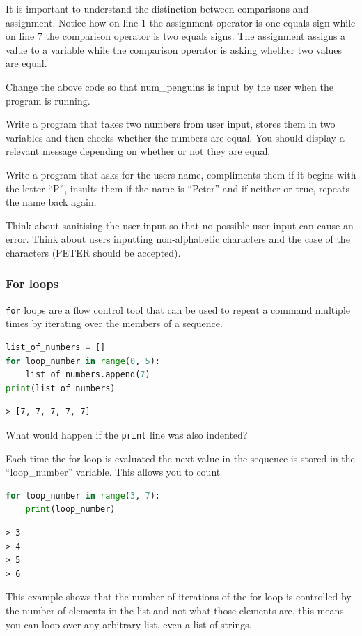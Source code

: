 It is important to understand the distinction between comparisons and assignment. Notice how on line 1 the assignment operator is one equals sign while on line 7 the comparison operator is two equals signs. The assignment assigns a value to a variable while the comparison operator is asking whether two values are equal.
		\begin{task}Change the above code so that num\_penguins is input by the user when the program is running.\end{task}
		\begin{task}Write a program that takes two numbers from user input, stores them in two variables and then checks whether the numbers are equal. You should display a relevant message depending on whether or not they are equal.\end{task}
		\begin{task} Write a program that asks for the users name, compliments them if it begins with the letter ``P'', insults them if the name is ``Peter'' and if neither or true, repeats the name back again.\end{task}
		\begin{advancedtask}Think about sanitising the user input so that no possible user input can cause an error. Think about users inputting non-alphabetic characters and the case of the characters (PETER should be accepted).\end{advancedtask}


		\subsubsection{For loops}
		\texttt{for} loops are a flow control tool that can be used to repeat a command multiple times by iterating over the members of a sequence.
		\begin{lstlisting}[language=Python]
list_of_numbers = []
for loop_number in range(0, 5):
	list_of_numbers.append(7)
print(list_of_numbers)\end{lstlisting}
		\begin{verbatim}> [7, 7, 7, 7, 7]\end{verbatim}

		\begin{task}What would happen if the \texttt{print} line was also indented?\end{task}
		Each time the for loop is evaluated the next value in the sequence is stored in the ``loop\_number'' variable. This allows you to count
		\begin{lstlisting}[language=Python]
for loop_number in range(3, 7):
	print(loop_number)\end{lstlisting}
\begin{verbatim}
> 3
> 4
> 5
> 6
\end{verbatim}
		This example shows that the number of iterations of the for loop is controlled by the number of elements in the list and not what those elements are, this means you can loop over any arbitrary list, even a list of strings.

